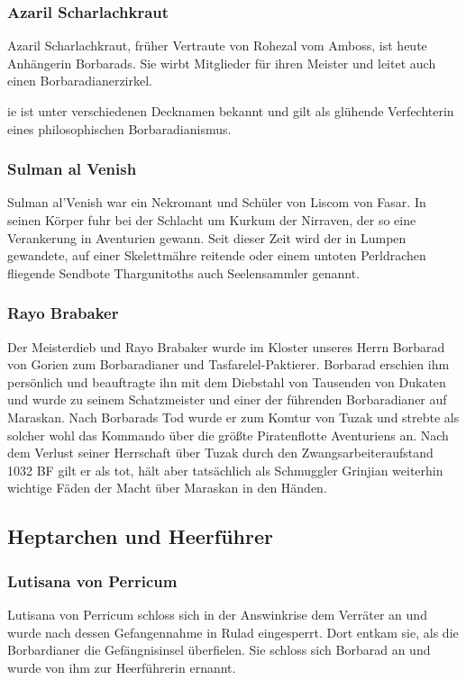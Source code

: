 \subsubsection{Azaril Scharlachkraut}
Azaril Scharlachkraut, früher Vertraute von Rohezal vom Amboss, ist heute Anhängerin Borbarads. Sie wirbt Mitglieder für ihren Meister und leitet auch einen Borbaradianerzirkel. 

ie ist unter verschiedenen Decknamen bekannt und gilt als glühende Verfechterin eines philosophischen Borbaradianismus.

\subsubsection{Sulman al Venish}
Sulman al'Venish war ein Nekromant und Schüler von Liscom von Fasar. In seinen Körper fuhr bei der Schlacht um Kurkum der Nirraven, der so eine Verankerung in Aventurien gewann. Seit dieser Zeit wird der in Lumpen gewandete, auf einer Skelettmähre reitende oder einem untoten Perldrachen fliegende Sendbote Thargunitoths auch Seelensammler genannt. 

\subsubsection{Rayo Brabaker}
Der Meisterdieb und Rayo Brabaker wurde im Kloster unseres Herrn Borbarad von Gorien zum Borbaradianer und Tasfarelel-Paktierer. Borbarad erschien ihm persönlich und beauftragte ihn mit dem Diebstahl von Tausenden von Dukaten und wurde zu seinem Schatzmeister und einer der führenden Borbaradianer auf Maraskan. Nach Borbarads Tod wurde er zum Komtur von Tuzak und strebte als solcher wohl das Kommando über die größte Piratenflotte Aventuriens an. Nach dem Verlust seiner Herrschaft über Tuzak durch den Zwangsarbeiteraufstand 1032 BF gilt er als tot, hält aber tatsächlich als Schmuggler Grinjian weiterhin wichtige Fäden der Macht über Maraskan in den Händen. 

\subsection{Heptarchen und Heerführer}
\subsubsection{Lutisana von Perricum}
Lutisana von Perricum schloss sich in der Answinkrise dem Verräter an und wurde nach dessen Gefangennahme in Rulad eingesperrt. Dort entkam sie, als die Borbardianer die Gefängnisinsel überfielen. Sie schloss sich Borbarad an und wurde von ihm zur Heerführerin ernannt. 

